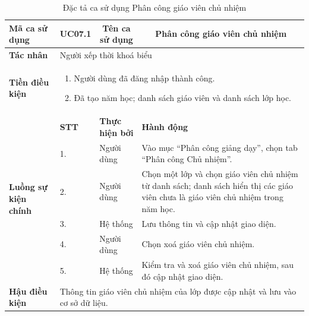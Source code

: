 \documentclass[../DoAn.tex]{subfiles}
\begin{document}
\begin{longtable}{|p{2.8cm}|p{1cm}|p{2.8cm}|p{6.3cm}|}
\caption{Đặc tả ca sử dụng Phân công giáo viên chủ nhiệm}
\label{tab:uc_phan_cong_chu_nhiem} \\
\hline
\multicolumn{1}{|l|}{\textbf{Mã ca sử dụng}} & \multicolumn{1}{c|}{UC07.1} & \multicolumn{1}{c|}{\textbf{Tên ca sử dụng}} & \multicolumn{1}{c|}{Phân công giáo viên chủ nhiệm} \\
\hline
\multicolumn{1}{|l|}{\textbf{Tác nhân}} & \multicolumn{3}{l|}{Người xếp thời khoá biểu} \\
\hline
\multicolumn{1}{|l|}{\textbf{Tiền điều kiện}} & \multicolumn{3}{p{10.5cm}|}{
\begin{enumerate}[leftmargin=*, noitemsep, topsep=0pt, partopsep=0pt, parsep=0pt]
    \item Người dùng đã đăng nhập thành công.
    \item Đã tạo năm học; danh sách giáo viên và danh sách lớp học.
\end{enumerate}} \\
\hline
\multirow{6}{2.8cm}{\textbf{Luồng sự kiện chính}} & \textbf{STT} & \textbf{Thực hiện bởi} & \textbf{Hành động} \\
\cline{2-4}
& 1. & Người dùng & Vào mục ``Phân công giảng dạy'', chọn tab ``Phân công Chủ nhiệm''. \\
\cline{2-4}
& 2. & Người dùng & Chọn một lớp và chọn giáo viên chủ nhiệm từ danh sách; danh sách hiển thị các giáo viên chưa là giáo viên chủ nhiệm trong năm học. \\
\cline{2-4}
& 3. & Hệ thống & Lưu thông tin và cập nhật giao diện. \\
\cline{2-4}
& 4. & Người dùng & Chọn xoá giáo viên chủ nhiệm. \\
\cline{2-4}
& 5. & Hệ thống & Kiểm tra và xoá giáo viên chủ nhiệm, sau đó cập nhật giao diện. \\
\hline
\multicolumn{1}{|l|}{\textbf{Hậu điều kiện}} & \multicolumn{3}{p{10.5cm}|}{Thông tin giáo viên chủ nhiệm của lớp được cập nhật và lưu vào cơ sở dữ liệu.} \\
\hline
\end{longtable}
\end{document}
